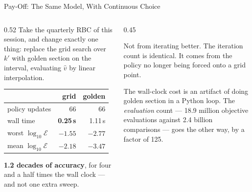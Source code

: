 \begin{frame}{Pay-Off: The Same Model, With Continuous Choice}
\begin{columns}[T]
\begin{column}{0.52\textwidth}
\small
Take the quarterly RBC of this session, and change exactly one thing: replace the grid search over $k'$ with golden section on the interval, evaluating $\hat v$ by linear interpolation.
\medskip
\begin{center}\footnotesize
\begin{tabularx}{\linewidth}{@{}>{\raggedright\arraybackslash}X r r@{}}
\toprule
 & \textbf{grid} & \textbf{golden} \\
\midrule
policy updates & 66 & 66 \\
wall time & \textbf{0.25\,s} & 1.11\,s \\
worst $\log_{10}\mathcal{E}$ & $-1.55$ & $\mathbf{-2.77}$ \\
mean $\log_{10}\mathcal{E}$ & $-2.18$ & $\mathbf{-3.47}$ \\
\bottomrule
\end{tabularx}
\end{center}
\medskip
\footnotesize
\textbf{1.2 decades of accuracy}, for four and a half times the wall clock --- and not one extra sweep.
\end{column}
\begin{column}{0.45\textwidth}
\begin{takeawaybox}[title=\textbf{Where the gain comes from}]\small
Not from iterating better. The iteration count is identical. It comes from the policy no longer being forced onto a grid point.
\end{takeawaybox}
\medskip
\begin{examplebox}\footnotesize
The wall-clock cost is an artifact of doing golden section in a Python loop. The \emph{evaluation} count --- 18.9 million objective evaluations against 2.4 billion comparisons --- goes the other way, by a factor of 125.
\end{examplebox}
\end{column}
\end{columns}
\end{frame}

